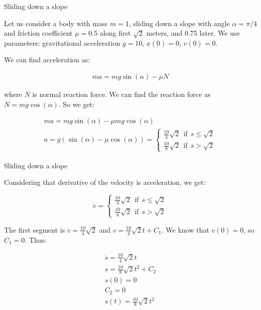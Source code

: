 \documentclass{beamer}
\begin{document}
\begin{frame}{Sliding down a slope}
	\begin{flushleft}
		
		Let us consider a body with mass $m = 1$, sliding down a slope with angle $\alpha = \pi / 4$ and friction coefficient $\mu = 0.5$ along first $\sqrt{2}$ meters, and 0.75 later. We use parameters: gravitational acceleration $g = 10$, $x(0) = 0$, $v(0) = 0$.
		
		\bigskip
		
		We can find acceleration as:
		
		\begin{align}
			m a = m g \sin (\alpha) - \mu N
		\end{align}				
	
	where $N$ is normal reaction force. We can find the reaction force as $N = mg \cos (\alpha)$. So we get:
	
	\begin{align}
		m a = m g \sin (\alpha) - \mu mg \cos (\alpha) \\
		a = g (\sin (\alpha) - \mu \cos (\alpha)) = 
		\begin{cases}
			\frac{10}{4} \sqrt{2} \ \  \text{if}  \ \ s \leq \sqrt{2} \\
			\frac{10}{8} \sqrt{2} \ \ \text{if}  \ \ s > \sqrt{2}
		\end{cases}
	\end{align}		
		
	\end{flushleft}
\end{frame}



\begin{frame}{Sliding down a slope}
	\begin{flushleft}
		
		Considering that derivative of the velocity is acceleration, we get:
		
		$$
			\dot v = 
			\begin{cases}
				\frac{10}{4} \sqrt{2} \ \  \text{if}  \ \ s \leq \sqrt{2} \\
				\frac{10}{8} \sqrt{2} \ \ \text{if}  \ \ s > \sqrt{2}
			\end{cases}
		$$
		
		The first segment is $\dot v = \frac{10}{4} \sqrt{2}$ and $v = \frac{10}{4} \sqrt{2} t + C_1$. We know that $v(0) = 0$, so $C_1 = 0$. Thus:
		
\begin{align}
\dot s = \frac{10}{4} \sqrt{2} t \\
s =  \frac{10}{8} \sqrt{2} t ^2 + C_2 \\
s(0) = 0 \\
C_2 = 0 \\
s(t) =  \frac{10}{8} \sqrt{2} t ^2 
\end{align}			
		
	\end{flushleft}
\end{frame}
\end{document}
